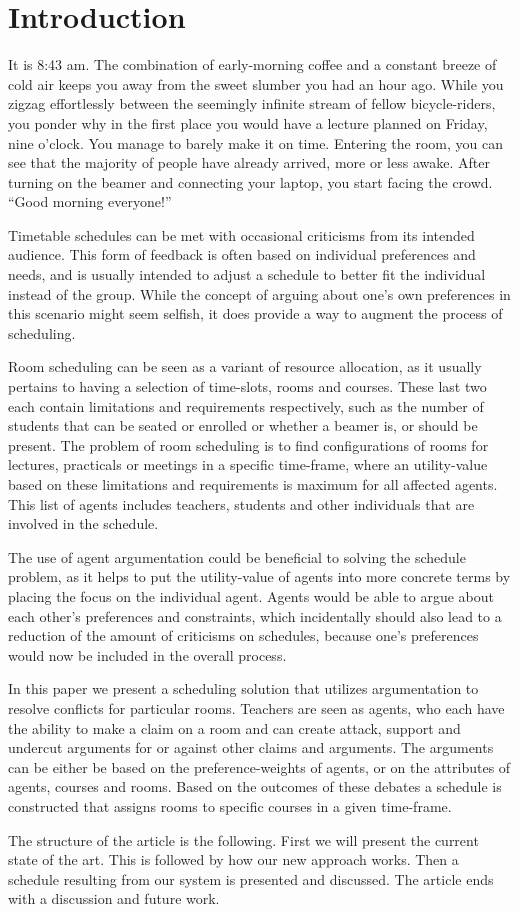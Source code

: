 \section{Introduction}
It is 8:43 am. The combination of early-morning coffee and a constant
breeze of cold air keeps you away from the sweet slumber you had an hour
ago. While you zigzag effortlessly between the seemingly infinite stream
of fellow bicycle-riders, you ponder why in the first place you would have
a lecture planned on Friday, nine o'clock. You manage to barely make it on
time. Entering the room, you can see that the majority of people have
already arrived, more or less awake. After turning on the beamer and
connecting your laptop, you start facing the crowd. ``Good morning
everyone!''

Timetable schedules can be met with occasional criticisms from its intended
audience. This form of feedback is often based on individual preferences
and needs, and is usually intended to adjust a schedule to better fit the
individual instead of the group. While the concept of arguing about one's
own preferences in this scenario might seem selfish, it does provide a way
to augment the process of scheduling.

Room scheduling can be seen as a variant of resource allocation, as it
usually pertains to having a selection of time-slots, rooms and courses.
These last two each contain limitations and requirements respectively, such
as the number of students that can be seated or enrolled or whether a
beamer is, or should be present. The problem of room scheduling is to find
configurations of rooms for lectures, practicals or meetings in a specific
time-frame, where an utility-value based on these limitations and
requirements is maximum for all affected agents. This list of agents
includes teachers, students and other individuals that are involved in the
schedule.            

The use of agent argumentation could be beneficial to solving the schedule
problem, as it helps to put the utility-value of agents into more concrete
terms by placing the focus on the individual agent. Agents would be able to
argue about each other's preferences and constraints, which incidentally
should also lead to a reduction of the amount of criticisms on schedules,
because one's preferences would now be included in the overall process. 

In this paper we present a scheduling solution that utilizes argumentation 
to resolve conflicts for particular rooms. Teachers are seen as agents, who 
each have the ability to make a claim on a room and can create attack, 
support and undercut arguments for or against other claims and arguments. 
The arguments can be either be based on the preference-weights of agents, 
or on the attributes of agents, courses and rooms. Based on the outcomes of 
these debates a schedule is constructed that assigns rooms to specific 
courses in a given time-frame.

The structure of the article is the following. First we will present the
current state of the art. This is followed by how our new approach works.
Then a schedule resulting from our system is presented and discussed. The
article ends with a discussion and future work.
